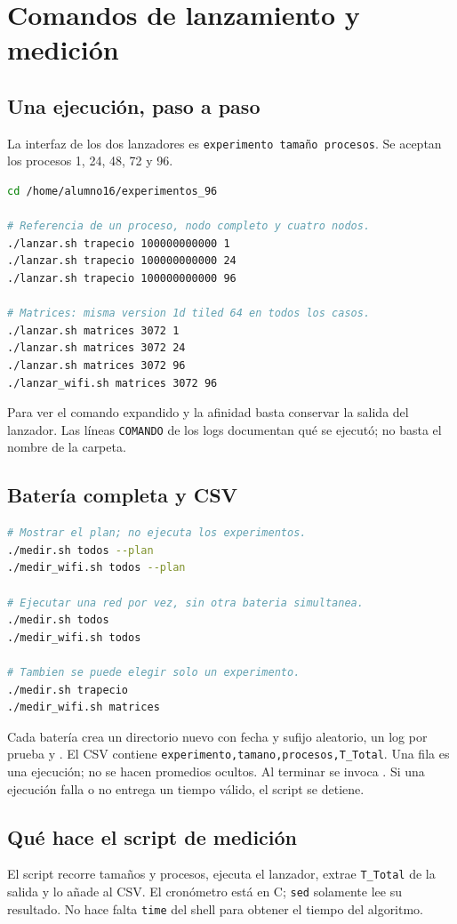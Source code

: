\clearpage
\section{Comandos de lanzamiento y medición}

\subsection{Una ejecución, paso a paso}
La interfaz de los dos lanzadores es \texttt{experimento tamaño procesos}. Se aceptan los procesos 1, 24, 48, 72 y 96.
\begin{lstlisting}[language=bash]
cd /home/alumno16/experimentos_96

# Referencia de un proceso, nodo completo y cuatro nodos.
./lanzar.sh trapecio 100000000000 1
./lanzar.sh trapecio 100000000000 24
./lanzar.sh trapecio 100000000000 96

# Matrices: misma version 1d tiled 64 en todos los casos.
./lanzar.sh matrices 3072 1
./lanzar.sh matrices 3072 24
./lanzar.sh matrices 3072 96
./lanzar_wifi.sh matrices 3072 96
\end{lstlisting}
Para ver el comando expandido y la afinidad basta conservar la salida del lanzador. Las líneas \texttt{COMANDO} de los logs documentan qué se ejecutó; no basta el nombre de la carpeta.

\subsection{Batería completa y CSV}
\begin{lstlisting}[language=bash]
# Mostrar el plan; no ejecuta los experimentos.
./medir.sh todos --plan
./medir_wifi.sh todos --plan

# Ejecutar una red por vez, sin otra bateria simultanea.
./medir.sh todos
./medir_wifi.sh todos

# Tambien se puede elegir solo un experimento.
./medir.sh trapecio
./medir_wifi.sh matrices
\end{lstlisting}
Cada batería crea un directorio nuevo con fecha y sufijo aleatorio, un log por prueba y . El CSV contiene \texttt{experimento,tamano,procesos,T\_Total}. Una fila es una ejecución; no se hacen promedios ocultos. Al terminar se invoca . Si una ejecución falla o no entrega un tiempo válido, el script se detiene.

\subsection{Qué hace el script de medición}
El script recorre tamaños y procesos, ejecuta el lanzador, extrae \texttt{T\_Total} de la salida y lo añade al CSV. El cronómetro está en C; \texttt{sed} solamente lee su resultado. No hace falta \texttt{time} del shell para obtener el tiempo del algoritmo.

